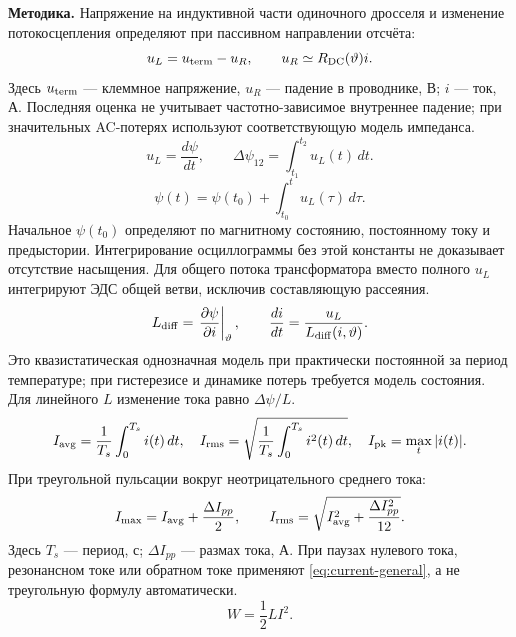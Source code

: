 \documentclass[14pt,a4paper]{extarticle}
\newcommand{\method}{\par\noindent\textbf{Методика.} }
\begin{document}
\method Напряжение на индуктивной части одиночного дросселя и изменение потокосцепления определяют при пассивном направлении отсчёта:
\begin{equation}
 u_L=u_{\rm term}-u_R,\qquad u_R\simeq R_{\rm DC}(\vartheta)i.
 \label{eq:inductive-voltage}
\end{equation}
Здесь $u_{\rm term}$ --- клеммное напряжение, $u_R$ --- падение в проводнике, В; $i$ --- ток, А. Последняя оценка не учитывает частотно-зависимое внутреннее падение; при значительных AC-потерях используют соответствующую модель импеданса.
\begin{equation}
 u_L=\frac{d\psi}{dt},\qquad
 \Delta\psi_{12}=\int_{t_1}^{t_2}u_L(t)\,dt.
 \label{eq:flux-linkage-voltage}
\end{equation}
\begin{equation}
 \psi(t)=\psi(t_0)+\int_{t_0}^{t}u_L(\tau)\,d\tau.
 \label{eq:flux-linkage-trajectory}
\end{equation}
Начальное $\psi(t_0)$ определяют по магнитному состоянию, постоянному току и предыстории. Интегрирование осциллограммы без этой константы не доказывает отсутствие насыщения. Для общего потока трансформатора вместо полного $u_L$ интегрируют ЭДС общей ветви, исключив составляющую рассеяния.
\begin{equation}
 L_{\rm diff}=\left.\frac{\partial\psi}{\partial i}\right|_{\vartheta},\qquad
 \frac{di}{dt}=\frac{u_L}{L_{\rm diff}(i,\vartheta)}.
 \label{eq:current-nonlinear}
\end{equation}
Это квазистатическая однозначная модель при практически постоянной за период температуре; при гистерезисе и динамике потерь требуется модель состояния. Для линейного $L$ изменение тока равно $\Delta\psi/L$.
\begin{equation}
 I_{\rm avg}=\frac1{T_s}\int_0^{T_s}i(t)\,dt,\quad
 I_{\rm rms}=\sqrt{\frac1{T_s}\int_0^{T_s}i^2(t)\,dt},\quad I_{\rm pk}=\max_t|i(t)|.
 \label{eq:current-general}
\end{equation}
При треугольной пульсации вокруг неотрицательного среднего тока:
\begin{equation}
 I_{\max}=I_{\rm avg}+\frac{\Delta I_{pp}}2,\qquad
 I_{\rm rms}=\sqrt{I_{\rm avg}^2+\frac{\Delta I_{pp}^2}{12}}.
 \label{eq:ipeak}
\end{equation}
Здесь $T_s$ --- период, с; $\Delta I_{pp}$ --- размах тока, А. При паузах нулевого тока, резонансном токе или обратном токе применяют \eqref{eq:current-general}, а не треугольную формулу автоматически.
\begin{equation}
 W=\frac12 LI^2.
 \label{eq:energy-linear}
\end{equation}
\end{document}
